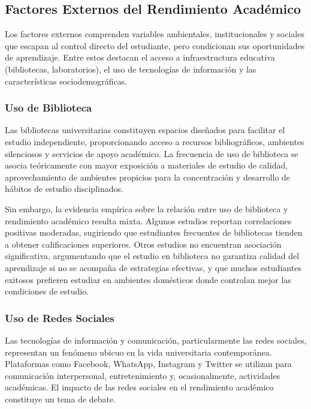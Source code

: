 \documentclass[
  stu,
  floatsintext,
  longtable,
  a4paper,
  nolmodern,
  notxfonts,
  notimes,
  12pt,
  colorlinks=true,linkcolor=blue,citecolor=blue,urlcolor=blue]{apa7}
\begin{document}
\subsection{Factores Externos del Rendimiento
Académico}\label{factores-externos-del-rendimiento-acaduxe9mico}

Los factores externos comprenden variables ambientales, institucionales
y sociales que escapan al control directo del estudiante, pero
condicionan sus oportunidades de aprendizaje. Entre estos destacan el
acceso a infraestructura educativa (bibliotecas, laboratorios), el uso
de tecnologías de información y las características sociodemográficas.

\subsubsection{Uso de Biblioteca}\label{uso-de-biblioteca}

Las bibliotecas universitarias constituyen espacios diseñados para
facilitar el estudio independiente, proporcionando acceso a recursos
bibliográficos, ambientes silenciosos y servicios de apoyo académico. La
frecuencia de uso de biblioteca se asocia teóricamente con mayor
exposición a materiales de estudio de calidad, aprovechamiento de
ambientes propicios para la concentración y desarrollo de hábitos de
estudio disciplinados.

Sin embargo, la evidencia empírica sobre la relación entre uso de
biblioteca y rendimiento académico resulta mixta. Algunos estudios
reportan correlaciones positivas moderadas, sugiriendo que estudiantes
frecuentes de bibliotecas tienden a obtener calificaciones superiores.
Otros estudios no encuentran asociación significativa, argumentando que
el estudio en biblioteca no garantiza calidad del aprendizaje si no se
acompaña de estrategias efectivas, y que muchos estudiantes exitosos
prefieren estudiar en ambientes domésticos donde controlan mejor las
condiciones de estudio.

\subsubsection{Uso de Redes Sociales}\label{uso-de-redes-sociales}

Las tecnologías de información y comunicación, particularmente las redes
sociales, representan un fenómeno ubicuo en la vida universitaria
contemporánea. Plataformas como Facebook, WhatsApp, Instagram y Twitter
se utilizan para comunicación interpersonal, entretenimiento y,
ocasionalmente, actividades académicas. El impacto de las redes sociales
en el rendimiento académico constituye un tema de debate.
\end{document}
